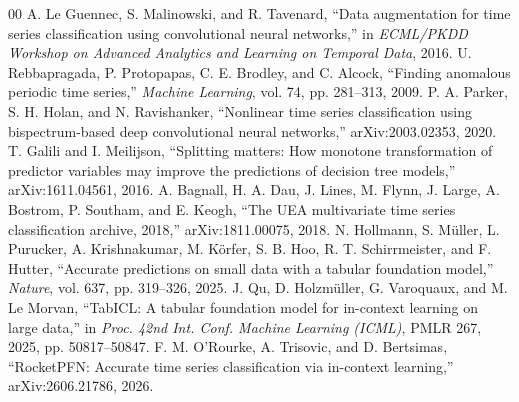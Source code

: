 \documentclass[conference]{IEEEtran}
\begin{document}
\begin{thebibliography}{00}
 A. Le Guennec, S. Malinowski, and R. Tavenard, ``Data augmentation for time series classification using convolutional neural networks,'' in \textit{ECML/PKDD Workshop on Advanced Analytics and Learning on Temporal Data}, 2016.
 U. Rebbapragada, P. Protopapas, C. E. Brodley, and C. Alcock, ``Finding anomalous periodic time series,'' \textit{Machine Learning}, vol. 74, pp. 281--313, 2009.
 P. A. Parker, S. H. Holan, and N. Ravishanker, ``Nonlinear time series classification using bispectrum-based deep convolutional neural networks,'' arXiv:2003.02353, 2020.
 T. Galili and I. Meilijson, ``Splitting matters: How monotone transformation of predictor variables may improve the predictions of decision tree models,'' arXiv:1611.04561, 2016.
 A. Bagnall, H. A. Dau, J. Lines, M. Flynn, J. Large, A. Bostrom, P. Southam, and E. Keogh, ``The UEA multivariate time series classification archive, 2018,'' arXiv:1811.00075, 2018.
 N. Hollmann, S. M\"uller, L. Purucker, A. Krishnakumar, M. K\"orfer, S. B. Hoo, R. T. Schirrmeister, and F. Hutter, ``Accurate predictions on small data with a tabular foundation model,'' \textit{Nature}, vol. 637, pp. 319--326, 2025.
 J. Qu, D. Holzm\"uller, G. Varoquaux, and M. Le Morvan, ``TabICL: A tabular foundation model for in-context learning on large data,'' in \textit{Proc. 42nd Int. Conf. Machine Learning (ICML)}, PMLR 267, 2025, pp. 50817--50847.
 F. M. O'Rourke, A. Trisovic, and D. Bertsimas, ``RocketPFN: Accurate time series classification via in-context learning,'' arXiv:2606.21786, 2026.
\end{thebibliography}
\end{document}
